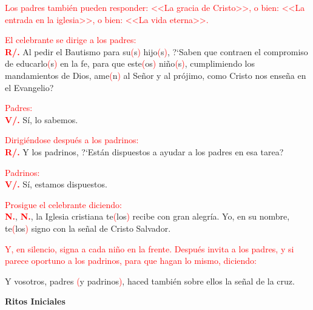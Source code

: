 \documentclass[12pt, letterpaper, spanish]{article}
\begin{document}
  \large {\textcolor{red}{Los padres tambi\'en pueden responder: <<La gracia de Cristo>>, o bien: <<La entrada en la iglesia>>, o bien: <<La vida eterna>>.}}

  \large {\textcolor{red}{El celebrante se dirige a los padres:}}\\
  \Large {\bfseries \textcolor{red}{R/.}} \hspace{1cm} \Large {Al pedir el Bautismo para su\textcolor{red}{(}s\textcolor{red}{)} hijo\textcolor{red}{(}s\textcolor{red}{)}, ?`Saben que contraen el compromiso de educarlo\textcolor{red}{(}s\textcolor{red}{)} en la fe, para que este\textcolor{red}{(}os\textcolor{red}{)} ni\~no\textcolor{red}{(}s\textcolor{red}{)}, cumplimiendo los mandamientos de Dios, ame\textcolor{red}{(}n\textcolor{red}{)} al Se\~nor y al pr\'ojimo, como Cristo nos ense\~na en el Evangelio?}

  \large {\textcolor{red}{Padres:}}\\
  {\bfseries \textcolor{red}{V/.}} \hspace{1cm} S\'i, lo sabemos.

  \large {\textcolor{red}{Dirigi\'endose despu\'es a los padrinos:}}\\
  \Large {\bfseries \textcolor{red}{R/.}} \hspace{1cm} Y los padrinos, ?`Est\'an dispuestos a ayudar a los padres en esa tarea?

  \large {\textcolor{red}{Padrinos:}}\\
  {\bfseries \textcolor{red}{V/.}} \hspace{1cm} S\'i, estamos dispuestos. 

  \large {\textcolor{red}{Prosigue el celebrante diciendo:}} \\
  \noindent
  \Large {\bfseries \textcolor{red}{N.}}, \Large {\bfseries \textcolor{red}{N.}}, \Large {la Iglesia cristiana te\textcolor{red}{(}los\textcolor{red}{)} recibe con gran alegr\'ia. Yo, en su nombre, te\textcolor{red}{(}los\textcolor{red}{)} signo con la se\~nal de Cristo Salvador.}

  \large {\textcolor{red}{Y, en silencio, signa a cada ni\~no en la frente. Despu\'es invita a los padres, y si parece oportuno a los padrinos, para que hagan lo mismo, diciendo:}} 

  \noindent
  \Large {Y vosotros, padres \textcolor{red}{(}y padrinos\textcolor{red}{)}, haced tambi\'en sobre ellos la se\~nal de la cruz.}

  \clearpage
  
  \begin{center}
    \Huge {\bfseries Ritos Iniciales}
  \end{center}
\end{document}

